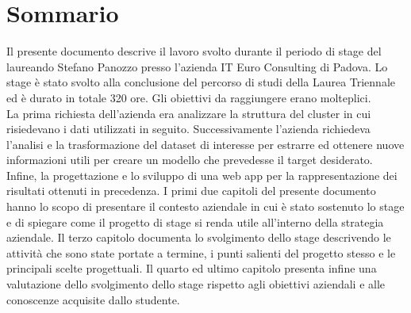 
\cleardoublepage
{}
{}
\begingroup
\let\clearpage\relax
\let\cleardoublepage\relax
\let\cleardoublepage\relax

\chapter*{Sommario}

Il presente documento descrive il lavoro svolto durante il periodo di stage del laureando Stefano Panozzo presso l'azienda IT Euro Consulting di Padova. Lo stage è stato svolto alla conclusione del percorso di studi della Laurea Triennale ed è durato in totale 320 ore.
Gli obiettivi da raggiungere erano molteplici.\\
La prima richiesta dell'azienda era analizzare la struttura del \gls{cluster} in cui risiedevano i dati utilizzati in seguito. 
Successivamente l'azienda richiedeva l'analisi e la trasformazione del dataset di interesse per estrarre ed ottenere nuove informazioni utili per creare un modello che prevedesse il target desiderato. 
Infine, la progettazione e lo sviluppo di una \gls{web app} per la rappresentazione dei risultati ottenuti in precedenza.
I primi due capitoli del presente documento hanno lo scopo di presentare il contesto aziendale in cui è stato sostenuto lo stage e di spiegare come il progetto di stage si renda utile all’interno della strategia aziendale. Il terzo capitolo documenta lo svolgimento dello stage descrivendo le attività che sono state portate a termine, i punti salienti del progetto stesso e le principali scelte progettuali. Il quarto ed ultimo capitolo presenta infine una valutazione dello svolgimento dello stage rispetto agli obiettivi aziendali e alle conoscenze acquisite dallo studente.

%
%

\endgroup			

\vfill

